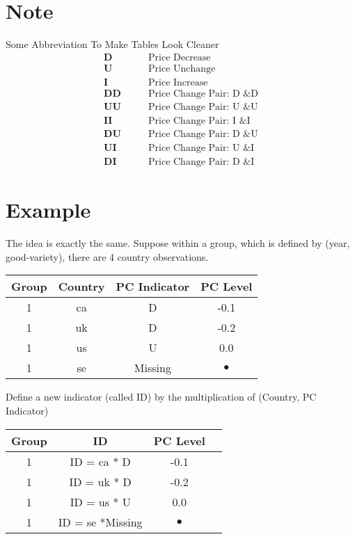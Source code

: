 
\section*{Note}
Some Abbreviation To Make Tables Look Cleaner
\begin{align}
\textbf{D}  & \qquad \text{Price Decrease}\\
\textbf{U}  & \qquad \text{Price Unchange}\\ 
\textbf{I}  & \qquad \text{Price Increase}\\ 
\textbf{DD} & \qquad \text{Price Change Pair: D \& D}\\ 
\textbf{UU} & \qquad \text{Price Change Pair: U \& U}\\ 
\textbf{II} & \qquad \text{Price Change Pair: I \& I}\\ 
\textbf{DU} & \qquad \text{Price Change Pair: D \& U}\\ 
\textbf{UI} & \qquad \text{Price Change Pair: U \& I}\\ 
\textbf{DI} & \qquad \text{Price Change Pair: D \& I}
\end{align}

\section*{Example}

The idea is exactly the same. Suppose within a group, which is defined by (year, good-variety), there are 4 country observations.

\begin{tabular}{cccc}
	\hline\hline
	Group & Country & PC Indicator &   PC Level   \\ \hline
	  1   &   ca    &      D       &    -0.1     \\
	  1   &   uk    &      D       &    -0.2     \\
	  1   &   us    &      U       &     0.0     \\
	  1   &   se    &   Missing    & $ \bullet $ \\ \hline\hline
\end{tabular}

Define a new indicator (called ID) by the multiplication of (Country, PC Indicator)

\begin{tabular}{cccc}
	\hline\hline
	Group &        ID        &  PC Level   &  \\ \hline
	  1   &   ID = ca * D    &    -0.1     &  \\
	  1   &  ID = uk *   D   &    -0.2     &  \\
	  1   &  ID = us *   U   &     0.0     &  \\
	  1   & ID = se *Missing & $ \bullet $ &  \\ \hline\hline
\end{tabular}

